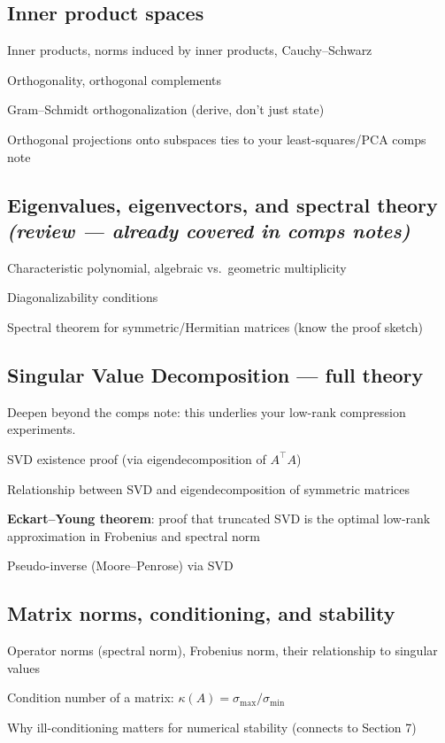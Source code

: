 \documentclass[11pt]{article}
\newcommand{\review}{\textit{(review — already covered in comps notes)}}
\newcommand{\note}[1]{\textcolor{gray!70!black}{\small #1}}
\begin{document}
\subsection{Inner product spaces}
\begin{tasklist}
    \item Inner products, norms induced by inner products, Cauchy--Schwarz
    \item Orthogonality, orthogonal complements
    \item Gram--Schmidt orthogonalization (derive, don't just state)
    \item Orthogonal projections onto subspaces \note{ties to your least-squares/PCA comps note}
\end{tasklist}

\subsection{Eigenvalues, eigenvectors, and spectral theory \review}
\begin{tasklist}
    \item Characteristic polynomial, algebraic vs.\ geometric multiplicity
    \item Diagonalizability conditions
    \item Spectral theorem for symmetric/Hermitian matrices (know the proof sketch)
\end{tasklist}

\subsection{Singular Value Decomposition — full theory}
\note{Deepen beyond the comps note: this underlies your low-rank compression experiments.}
\begin{tasklist}
    \item SVD existence proof (via eigendecomposition of $A^\top A$)
    \item Relationship between SVD and eigendecomposition of symmetric matrices
    \item \textbf{Eckart--Young theorem}: proof that truncated SVD is the optimal low-rank approximation in Frobenius and spectral norm
    \item Pseudo-inverse (Moore--Penrose) via SVD
\end{tasklist}

\subsection{Matrix norms, conditioning, and stability}
\begin{tasklist}
    \item Operator norms (spectral norm), Frobenius norm, their relationship to singular values
    \item Condition number of a matrix: $\kappa(A) = \sigma_{\max}/\sigma_{\min}$
    \item Why ill-conditioning matters for numerical stability (connects to Section 7)
\end{tasklist}
\end{document}
